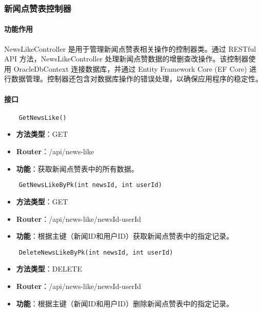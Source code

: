 \subsubsection{新闻点赞表控制器}

\paragraph{功能作用}

NewsLikeController 是用于管理新闻点赞表相关操作的控制器类。通过 RESTful API 方法，NewsLikeController 处理新闻点赞数据的增删查改操作。该控制器使用 OracleDbContext 连接数据库，并通过 Entity Framework Core (EF Core) 进行数据管理。控制器还包含对数据库操作的错误处理，以确保应用程序的稳定性。

\paragraph{接口}

\begin{verbatim}
	GetNewsLike()
\end{verbatim}

\begin{itemize}
	\item \textbf{方法类型}：GET
	\item \textbf{Router}：/api/news-like
	\item \textbf{功能}：获取新闻点赞表中的所有数据。
\end{itemize}

\begin{verbatim}
	GetNewsLikeByPk(int newsId, int userId)
\end{verbatim}

\begin{itemize}
	\item \textbf{方法类型}：GET
	\item \textbf{Router}：/api/news-like/{newsId}-{userId}
	\item \textbf{功能}：根据主键（新闻ID和用户ID）获取新闻点赞表中的指定记录。
\end{itemize}

\begin{verbatim}
	DeleteNewsLikeByPk(int newsId, int userId)
\end{verbatim}

\begin{itemize}
	\item \textbf{方法类型}：DELETE
	\item \textbf{Router}：/api/news-like/{newsId}-{userId}
	\item \textbf{功能}：根据主键（新闻ID和用户ID）删除新闻点赞表中的指定记录。
\end{itemize}

